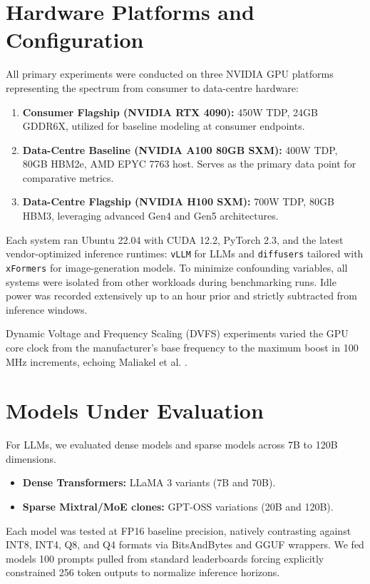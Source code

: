\documentclass[12pt, a4paper]{report}
\begin{document}
\section{Hardware Platforms and Configuration}
All primary experiments were conducted on three NVIDIA GPU platforms representing the spectrum from consumer to data-centre hardware:
\begin{enumerate}
    \item \textbf{Consumer Flagship (NVIDIA RTX 4090):} 450W TDP, 24GB GDDR6X, utilized for baseline modeling at consumer endpoints.
    \item \textbf{Data-Centre Baseline (NVIDIA A100 80GB SXM):} 400W TDP, 80GB HBM2e, AMD EPYC 7763 host. Serves as the primary data point for comparative metrics.
    \item \textbf{Data-Centre Flagship (NVIDIA H100 SXM):} 700W TDP, 80GB HBM3, leveraging advanced Gen4 and Gen5 architectures.
\end{enumerate}
Each system ran Ubuntu 22.04 with CUDA 12.2, PyTorch 2.3, and the latest vendor-optimized inference runtimes: \texttt{vLLM} for LLMs and \texttt{diffusers} tailored with \texttt{xFormers} for image-generation models. To minimize confounding variables, all systems were isolated from other workloads during benchmarking runs. Idle power was recorded extensively up to an hour prior and strictly subtracted from inference windows.

Dynamic Voltage and Frequency Scaling (DVFS) experiments varied the GPU core clock from the manufacturer's base frequency to the maximum boost in 100 MHz increments, echoing Maliakel et al. \cite{maliakel2025dvfs}. 

\section{Models Under Evaluation}
For LLMs, we evaluated dense models and sparse models across 7B to 120B dimensions.
\begin{itemize}
    \item \textbf{Dense Transformers:} LLaMA 3 variants (7B and 70B).
    \item \textbf{Sparse Mixtral/MoE clones:} GPT-OSS variations (20B and 120B).
\end{itemize}
Each model was tested at FP16 baseline precision, natively contrasting against INT8, INT4, Q8, and Q4 formats via BitsAndBytes and GGUF wrappers. We fed models 100 prompts pulled from standard leaderboards forcing explicitly constrained 256 token outputs to normalize inference horizons.
\end{document}
